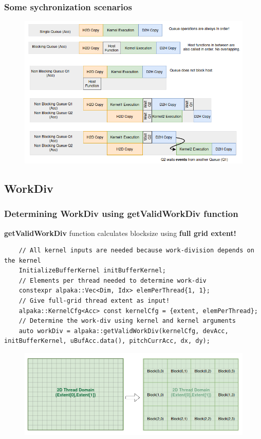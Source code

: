 \documentclass[9pt]{beamer}
\begin{document}
\begin{frame}
\frametitle{Some sychronization scenarios}
\begin{figure}
    \centering
    \includegraphics[width=0.93\linewidth]{Screenshot from 2024-10-16 16-53-06.png}
    \label{fig:enter-label}
\end{figure}
\end{frame}


\subsection{WorkDiv}
\begin{frame}[fragile]
\frametitle{Determining WorkDiv using getValidWorkDiv function}
\textbf{getValidWorkDiv} function calculates blocksize using \textbf{full grid extent!}
\lstset{basicstyle=\ttfamily\scriptsize}
\begin{lstlisting}
    // All kernel inputs are needed because work-division depends on the kernel
    InitializeBufferKernel initBufferKernel;
    // Elements per thread needed to determine work-div
    constexpr alpaka::Vec<Dim, Idx> elemPerThread{1, 1};
    // Give full-grid thread extent as input!
    alpaka::KernelCfg<Acc> const kernelCfg = {extent, elemPerThread};
    // Determine the work-div using kernel and kernel arguments
    auto workDiv = alpaka::getValidWorkDiv(kernelCfg, devAcc, initBufferKernel, uBufAcc.data(), pitchCurrAcc, dx, dy);
\end{lstlisting}
\begin{figure}
    \centering
    \includegraphics[width=0.75\linewidth]{Screenshot from 2024-10-18 15-16-26.png}
\end{figure}
\end{frame}
\end{document}
